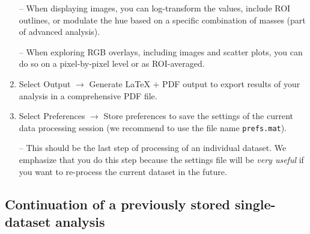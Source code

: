 \documentclass[a4paper, 11pt]{article}
\newcommand{\ttt}[1]{\texttt{#1}}
\newcommand{\lans}[1]{{\color{magenta}#1}}
\newcommand{\lanscb}[1]{{\color{darkgreen}#1}}
\newcommand\mnote{\marginnote{\fbox{\textbf{\bf Note}}}}
\newcommand\ra{\rightarrow}
\newcommand\addon[1]{-- {\small #1}}
\begin{document}
\begin{enumerate}
\addon{When displaying images, you can \lanscb{log-transform} the values, \lanscb{include ROI outlines}, or \lanscb{modulate the hue} based on a specific combination of masses (part of advanced analysis).}

\addon{When exploring RGB overlays, including images and scatter plots, you can do so on a \lanscb{pixel-by-pixel} level or as \lanscb{ROI-averaged}.}

\item Select \lans{Output} $\ra$ \lans{Generate LaTeX + PDF output} to export results of your analysis in a comprehensive PDF file. 


\item Select \lans{Preferences} $\ra$ \lans{Store preferences} to save the settings of the current data processing session (we recommend to use the file name \ttt{prefs.mat}).

\addon{This should be the last step of processing of an individual dataset. We emphasize that you do this step because the settings file will be \emph{very useful} if you want to re-process the current dataset in the future.}


\end{enumerate}


\subsection{Continuation of a previously stored single-dataset analysis}
\end{document}
